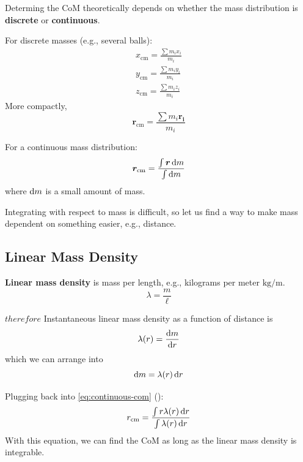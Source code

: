 \documentclass[a4paper, titlepage]{book}
\begin{document}
Determing the CoM theoretically
depends on whether the mass distribution is \textbf{discrete} or \textbf{continuous}.

For discrete masses (e.g., several balls):
\begin{equation}
    \begin{aligned}
        x_{\mathrm{cm}} = \frac{\sum m_i x_i}{m_i} \\
        y_{\mathrm{cm}} = \frac{\sum m_i y_i}{m_i} \\
        z_{\mathrm{cm}} = \frac{\sum m_i z_i}{m_i}
    \end{aligned}
\end{equation}
More compactly,
\begin{equation}
    \bm{r_{\mathrm{cm}}} = \frac{\sum m_i \bm{r_i}}{m_i}
\end{equation}


For a continuous mass distribution:
\begin{equation} \label{eq:continuous-com}
    \bm{r}_{\mathrm{cm}} = \frac{\int \bm{r} \odif{m}}{\int \odif{m}}
\end{equation}
where \(\odif{m}\) is a small amount of mass.

Integrating with respect to mass is difficult,
so let us find a way to make mass dependent on something easier,
e.g., distance.

\subsection{Linear Mass Density}

\textbf{Linear mass density} is mass per length, e.g.,
kilograms per meter \(\unit{\kilogram \per \meter}\).
\begin{equation}
    \lambda = \frac{m}{\ell}
\end{equation}

\(therefore\) Instantaneous linear mass density as a function of distance is
\begin{equation}
    \lambda(r) = \odv{m}{r}
\end{equation}
which we can arrange into
\begin{equation}
    \odif{m} = \lambda(r) \odif{r}
\end{equation}

Plugging back into \cref{eq:continuous-com} ():
\begin{equation}
    r_{\mathrm{cm}} = \frac{\int r \lambda(r) \odif{r}}{\int \lambda(r) \odif{r}}
\end{equation}
With this equation,
we can find the CoM as long as the linear mass density is integrable.
\end{document}
